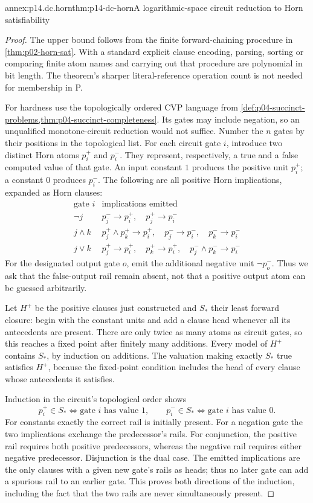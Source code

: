 \begin{annexitem}{annex:p14.dc.horn}{thm:p14-dc-horn}{A logarithmic-space circuit reduction to Horn satisfiability}
\begin{proof}
The upper bound follows from the finite forward-chaining procedure in
\cref{thm:p02-horn-sat}. With a standard explicit clause encoding, parsing,
sorting or comparing finite atom names and carrying out that procedure are
polynomial in bit length. The theorem's sharper literal-reference operation
count is not needed for membership in P.

For hardness use the topologically ordered CVP language from
\cref{def:p04-succinct-problems,thm:p04-succinct-completeness}. Its gates may
include negation, so an unqualified monotone-circuit reduction would not
suffice. Number the \(n\) gates by their positions in the topological list.
For each circuit gate \(i\), introduce two distinct Horn atoms
\(p_i^+\) and \(p_i^-\). They represent, respectively, a true and a false
computed value of that gate. An input constant \(1\) produces the positive
unit \(p_i^+\); a constant \(0\) produces \(p_i^-\). The following are all
positive Horn implications, expanded as Horn clauses:
\[
\begin{array}{c|l}
\text{gate }i&\text{implications emitted}\\ \hline
\neg j&
 p_j^-\to p_i^+,\quad p_j^+\to p_i^-\\
j\land k&
 p_j^+\land p_k^+\to p_i^+,\quad
 p_j^-\to p_i^-,\quad p_k^-\to p_i^-\\
j\lor k&
 p_j^+\to p_i^+,\quad p_k^+\to p_i^+,\quad
 p_j^-\land p_k^-\to p_i^-
\end{array}
\]
For the designated output gate \(o\), emit the additional negative unit
\(\neg p_o^-\). Thus we ask that the false-output rail remain absent, not
that a positive output atom can be guessed arbitrarily.

Let \(H^+\) be the positive clauses just constructed and \(S_*\) their least
forward closure: begin with the constant units and add a clause head whenever
all its antecedents are present. There are only twice as many atoms as circuit
gates, so this reaches a fixed point after finitely many additions. Every
model of \(H^+\) contains \(S_*\), by induction on additions. The valuation
making exactly \(S_*\) true satisfies \(H^+\), because the fixed-point
condition includes the head of every clause whose antecedents it satisfies.

Induction in the circuit's topological order shows
\[
 p_i^+\in S_*\Longleftrightarrow \text{gate }i\text{ has value }1,
 \qquad
 p_i^-\in S_*\Longleftrightarrow \text{gate }i\text{ has value }0.
\]
For constants exactly the correct rail is initially present. For a negation
gate the two implications exchange the predecessor's rails. For conjunction,
the positive rail requires both positive predecessors, whereas the negative
rail requires either negative predecessor. Disjunction is the dual case.
The emitted implications are the only clauses with a given new gate's rails
as heads; thus no later gate can add a spurious rail to an earlier gate.
This proves both directions of the induction, including the fact that the
two rails are never simultaneously present.


\end{proof}
\end{annexitem}
